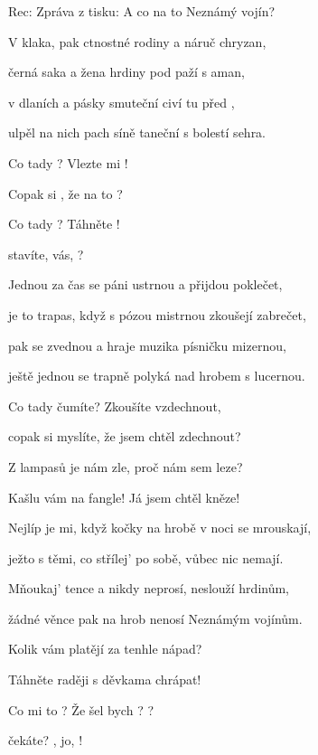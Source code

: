 

Rec: Zpráva z tisku:  A co na to Neznámý vojín?

\zs
V  klaka, pak ctnostné rodiny a náruč chryzan,

černá saka a žena hrdiny pod paží s aman,

 v dlaních a pásky smuteční civí tu před ,

ulpěl na nich pach síně taneční s bolestí sehra.
\ks

\zr
Co tady ? Vlezte mi !

Copak si , že na to ?

Co tady ? Táhněte !

 stavíte,  vás, ?  
\kr

\zs
Jednou za čas se páni ustrnou a přijdou poklečet,

je to trapas, když s pózou mistrnou zkoušejí zabrečet,

pak se zvednou a hraje muzika písničku mizernou,

ještě jednou se trapně polyká nad hrobem s lucernou.
\ks

\zr
Co tady čumíte? Zkoušíte vzdechnout,

copak si myslíte, že jsem chtěl zdechnout?

Z lampasů je nám zle, proč nám sem leze?

Kašlu vám na fangle! Já jsem chtěl kněze!
\kr

\zs
Nejlíp je mi, když kočky na hrobě v noci se mrouskají,

ježto s těmi, co střílej' po sobě, vůbec nic nemají.

Mňoukaj' tence a nikdy neprosí, neslouží hrdinům,

žádné věnce pak na hrob nenosí Neznámým vojínům.
\ks

\zr
Kolik vám platějí za tenhle nápad?

Táhněte raději s děvkama chrápat!

Co mi to ? Že šel bych ? ?

 čekáte? , jo, !  
\kr

\kp






